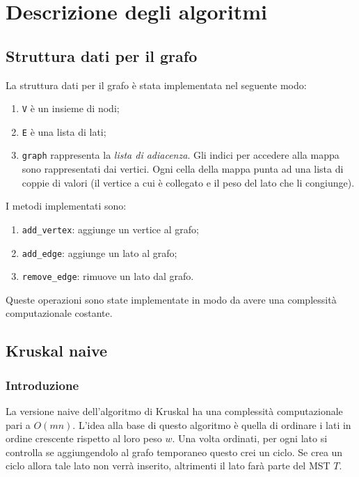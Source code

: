 \section{Descrizione degli algoritmi}

\subsection{Struttura dati per il grafo}

La struttura dati per il grafo è stata implementata nel seguente
modo:
\begin{enumerate}
    \item \verb|V| è un insieme di nodi;
    \item \verb|E| è una lista di lati;
    \item \verb|graph| rappresenta la \textit{lista di adiacenza}.
    Gli indici per accedere alla mappa sono rappresentati dai vertici.
    Ogni cella della mappa punta ad una lista di coppie di valori
    (il vertice a cui è collegato e il peso del lato che li
    congiunge).
\end{enumerate}

I metodi implementati sono:
\begin{enumerate}
    \item \verb|add_vertex|: aggiunge un vertice al grafo;
    \item \verb|add_edge|: aggiunge un lato al grafo;
    \item \verb|remove_edge|: rimuove un lato dal grafo.
\end{enumerate}
Queste operazioni sono state implementate in modo da avere una
complessità computazionale costante.

\subsection{Kruskal naive}

\subsubsection{Introduzione}

La versione naive dell'algoritmo di Kruskal ha una complessità
computazionale pari a $O(mn)$. L'idea alla base di questo
algoritmo è quella di ordinare i lati in ordine crescente rispetto al
loro peso $w$. Una volta ordinati, per ogni lato si controlla se
aggiungendolo al grafo temporaneo questo crei un ciclo. Se crea un
ciclo allora tale lato non verrà inserito, altrimenti il lato farà
parte del MST $T$.

